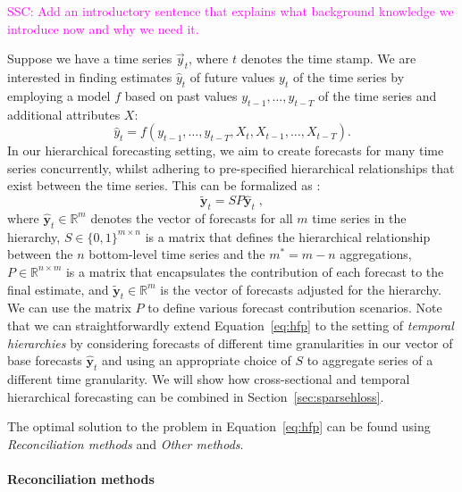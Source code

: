 \documentclass[preprint, 3p, times, twocolumn]{elsarticle}
\newcommand{\ssc}[1]{\textcolor{magenta}{SSC: #1.}}
\begin{document}
\ssc{Add an introductory sentence that explains what background knowledge we introduce now and why we need it}

Suppose we have a time series \(\vec{y}_t\), where \(t\) denotes the time stamp. We are interested in finding estimates \(\hat{y}_{t}\) of future values \({y}_{t}\) of the time series by employing a model \(f\) based on past values \(y_{t-1}, \dots, y_{t-T}\) of the time series and additional attributes \(X\):
\begin{equation}
  \hat{y}_{t} = f(y_{t-1}, \dots, y_{t-T}, X_{t}, X_{t-1}, \dots, X_{t-T}).
\end{equation}
In our hierarchical forecasting setting, we aim to create forecasts for many time series concurrently, whilst adhering to pre-specified hierarchical relationships that exist between the time series. This can be formalized as \cite{hyndman_forecasting_2021}:
\begin{equation} \label{eq:hfp}
  \tilde{\textbf{y}}_{t} = SP\hat{\textbf{y}}_{t} \;,
\end{equation}
where \(\hat{\textbf{y}}_{t} \in \mathbb{R}^{m} \) denotes the vector of forecasts for all \(m\) time series in the hierarchy, \(S \in \{0, 1\}^{m \times n}\) is a matrix that defines the hierarchical relationship between the \(n\) bottom-level time series and the \(m^* = m - n\) aggregations, \(P \in \mathbb{R}^{n \times m}\) is a matrix that encapsulates the contribution of each forecast to the final estimate, and \(\tilde{\textbf{y}}_{t} \in \mathbb{R}^{m} \) is the vector of forecasts adjusted for the hierarchy. We can use the matrix \(P\) to define various forecast contribution scenarios. Note that we can straightforwardly extend Equation~\eqref{eq:hfp} to the setting of \textit{temporal hierarchies} \cite{athanasopoulos_forecasting_2017,rangapuram_coherent_2023} by considering forecasts of different time granularities in our vector of base forecasts \(\hat{\textbf{y}}_{t}\) and using an appropriate choice of \(S\) to aggregate series of a different time granularity. We will show how cross-sectional and temporal hierarchical forecasting can be combined in Section~\ref{sec:sparsehloss}.

The optimal solution to the problem in Equation~\eqref{eq:hfp} can be found using \textit{Reconciliation methods} and \textit{Other methods}.

\paragraph{Reconciliation methods}
\end{document}
